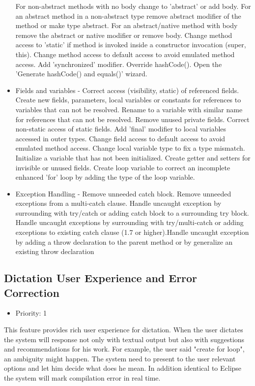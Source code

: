 \begin{itemize}
	For non-abstract methods with no body change to 'abstract' or add body. For an abstract method in a non-abstract type remove abstract modifier of the method or make type abstract. For an abstract/native method with body remove the abstract or native modifier or remove body. Change method access to 'static' if method is invoked inside a constructor invocation (super, this). Change method access to default access to avoid emulated method access. Add 'synchronized' modifier. Override hashCode(). Open the 'Generate hashCode() and equals()' wizard.
	\item Fields and variables - Correct access (visibility, static) of referenced fields. Create new fields, parameters, local variables or constants for references to variables that can not be resolved. Rename to a variable with similar name for references that can not be resolved. Remove unused private fields. Correct non-static access of static fields. Add 'final' modifier to local variables accessed in outer types. Change field access to default access to avoid emulated method access. Change local variable type to fix a type mismatch. Initialize a variable that has not been initialized. Create getter and setters for invisible or unused fields. Create loop variable to correct an incomplete enhanced 'for' loop by adding the type of the loop variable.
	\item Exception Handling - Remove unneeded catch block. Remove unneeded exceptions from a multi-catch clause. Handle uncaught exception by surrounding with try/catch or adding catch block to a surrounding try block. Handle uncaught exceptions by surrounding with try/multi-catch or adding exceptions to existing catch clause (1.7 or higher).Handle uncaught exception by adding a throw declaration to the parent method or by generalize an existing throw declaration
\end{itemize}
\subsection{Dictation User Experience and Error Correction}
\begin{itemize}
	\item Priority: 1
\end{itemize}
This feature provides rich user experience for dictation. When the user dictates the system will response not only with textual output but also with suggestions and recommendations for his work. For example, the user said "create for loop", an ambiguity might happen. The system need to present to the user relevant options and let him decide what does he mean. In addition identical to Eclipse the system will mark compilation error in real time.
